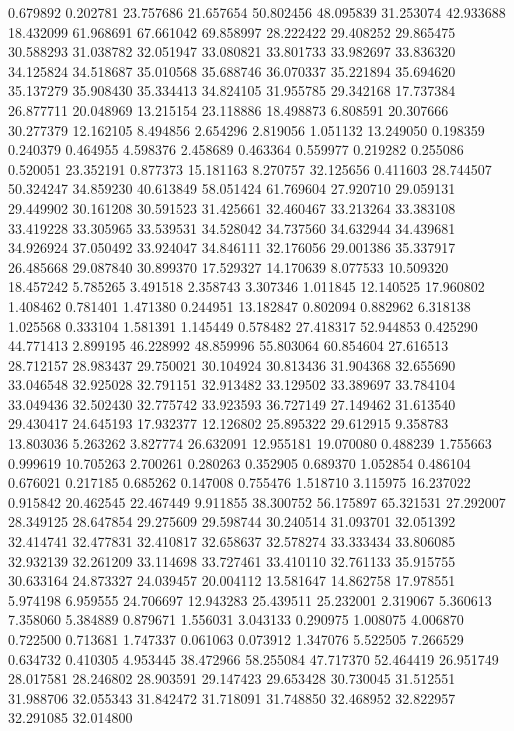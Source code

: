 0.679892
0.202781
23.757686
21.657654
50.802456
48.095839
31.253074
42.933688
18.432099
61.968691
67.661042
69.858997
28.222422
29.408252
29.865475
30.588293
31.038782
32.051947
33.080821
33.801733
33.982697
33.836320
34.125824
34.518687
35.010568
35.688746
36.070337
35.221894
35.694620
35.137279
35.908430
35.334413
34.824105
31.955785
29.342168
17.737384
26.877711
20.048969
13.215154
23.118886
18.498873
6.808591
20.307666
30.277379
12.162105
8.494856
2.654296
2.819056
1.051132
13.249050
0.198359
0.240379
0.464955
4.598376
2.458689
0.463364
0.559977
0.219282
0.255086
0.520051
23.352191
0.877373
15.181163
8.270757
32.125656
0.411603
28.744507
50.324247
34.859230
40.613849
58.051424
61.769604
27.920710
29.059131
29.449902
30.161208
30.591523
31.425661
32.460467
33.213264
33.383108
33.419228
33.305965
33.539531
34.528042
34.737560
34.632944
34.439681
34.926924
37.050492
33.924047
34.846111
32.176056
29.001386
35.337917
26.485668
29.087840
30.899370
17.529327
14.170639
8.077533
10.509320
18.457242
5.785265
3.491518
2.358743
3.307346
1.011845
12.140525
17.960802
1.408462
0.781401
1.471380
0.244951
13.182847
0.802094
0.882962
6.318138
1.025568
0.333104
1.581391
1.145449
0.578482
27.418317
52.944853
0.425290
44.771413
2.899195
46.228992
48.859996
55.803064
60.854604
27.616513
28.712157
28.983437
29.750021
30.104924
30.813436
31.904368
32.655690
33.046548
32.925028
32.791151
32.913482
33.129502
33.389697
33.784104
33.049436
32.502430
32.775742
33.923593
36.727149
27.149462
31.613540
29.430417
24.645193
17.932377
12.126802
25.895322
29.612915
9.358783
13.803036
5.263262
3.827774
26.632091
12.955181
19.070080
0.488239
1.755663
0.999619
10.705263
2.700261
0.280263
0.352905
0.689370
1.052854
0.486104
0.676021
0.217185
0.685262
0.147008
0.755476
1.518710
3.115975
16.237022
0.915842
20.462545
22.467449
9.911855
38.300752
56.175897
65.321531
27.292007
28.349125
28.647854
29.275609
29.598744
30.240514
31.093701
32.051392
32.414741
32.477831
32.410817
32.658637
32.578274
33.333434
33.806085
32.932139
32.261209
33.114698
33.727461
33.410110
32.761133
35.915755
30.633164
24.873327
24.039457
20.004112
13.581647
14.862758
17.978551
5.974198
6.959555
24.706697
12.943283
25.439511
25.232001
2.319067
5.360613
7.358060
5.384889
0.879671
1.556031
3.043133
0.290975
1.008075
4.006870
0.722500
0.713681
1.747337
0.061063
0.073912
1.347076
5.522505
7.266529
0.634732
0.410305
4.953445
38.472966
58.255084
47.717370
52.464419
26.951749
28.017581
28.246802
28.903591
29.147423
29.653428
30.730045
31.512551
31.988706
32.055343
31.842472
31.718091
31.748850
32.468952
32.822957
32.291085
32.014800
